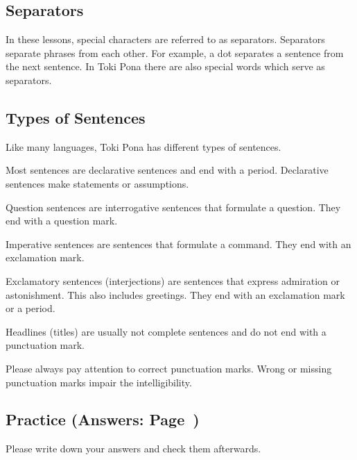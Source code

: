 %
\subsection*{Separators}
%
In these lessons, special characters are referred to as separators. 
Separators separate phrases from each other. 
For example, a dot separates a sentence from the next sentence. 
In Toki Pona there are also special words which serve as separators. 

%
\subsection*{Types of Sentences}
%
Like many languages, Toki Pona has different types of sentences. 

Most sentences are declarative sentences and end with a period. 
Declarative sentences make statements or assumptions. 

Question sentences are interrogative sentences that formulate a question. 
They end with a question mark. 

Imperative sentences are sentences that formulate a command. 
They end with an exclamation mark.

Exclamatory sentences (interjections) are sentences that express admiration or astonishment. 
This also includes greetings. 
They end with an exclamation mark or a period.

Headlines (titles) are usually not complete sentences and do not end with a punctuation mark.

Please always pay attention to correct punctuation marks. Wrong or missing
punctuation marks impair the intelligibility.

%
\newpage
\subsection*{Practice (Answers: Page~\pageref{'pronunciation_alphabet'})}

Please write down your answers and check them afterwards. 

